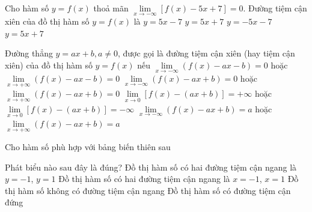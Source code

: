 \begin{ex}%
	Cho hàm số  $y=f(x)$ thoả mãn $\lim\limits_{x \to - \infty } [f(x)-5x+7]=0$. Đường tiệm cận xiên của đồ thị hàm số $y=f(x)$ là
	 \choice
		 {\True $y=5x-7$}
		 {$y=5x+7$}
		 {$y=-5x-7$}
		 {$y=5x+7$}
\end{ex}

\begin{ex}%
	Đường thẳng $y = ax + b, a \neq 0$, được  gọi là đường tiệm cận xiên (hay tiệm cận xiên) của đồ thị hàm số $y = f(x)$ nếu
	\choice 
		{\True $\lim\limits_{x\to -\infty }(f(x)-ax-b)=0$ hoặc $\lim\limits_{x\to +\infty }(f(x)-ax-b)=0$} 
		 {$\lim\limits_{x\to -\infty }(f(x)-ax+b)=0$ hoặc $\lim\limits_{x\to +\infty }(f(x)-ax+b)=0$}
		{$\lim\limits_{x\to 0  }[f(x)-(ax+b)]=+\infty $ hoặc $\lim\limits_{x\to 0 }[f(x)-(ax+b)]=-\infty $}
		{$\lim\limits_{x\to -\infty }(f(x)-ax+b)=a$  hoặc $\lim\limits_{x\to +\infty }(f(x)-ax+b)=a$}
\end{ex}

\begin{ex}%
	Cho hàm số phù hợp với bảng biến thiên sau 
	\begin{center}
	\end{center}
	Phát biểu nào sau đây là  đúng?
	\choice 
		{\True Đồ thị hàm số có hai đường tiệm  cận ngang là $y=-1$, $y=1$}
		{Đồ thị hàm  số có hai đường tiệm cận ngang là $x=-1$, $x=1$}
		{Đồ thị hàm  số không có đường tiệm cận ngang}
		{Đồ thị hàm  số có đường tiệm cận đứng}
\end{ex}


